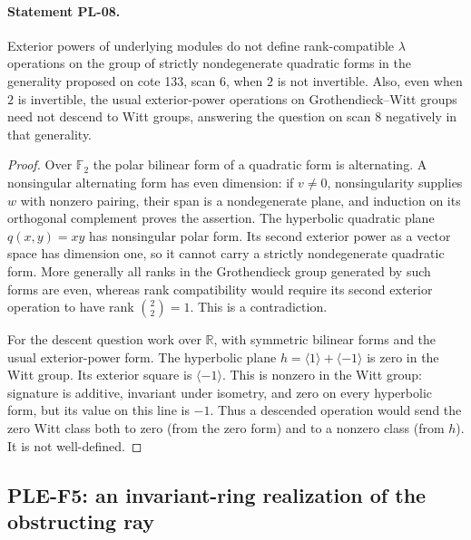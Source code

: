 \paragraph{Statement PL-08.}
Exterior powers of underlying modules do not define rank-compatible
$\lambda$ operations on the group of strictly nondegenerate quadratic forms
in the generality proposed on cote 133, scan 6, when $2$ is not invertible.
Also, even when $2$ is invertible, the usual exterior-power operations on
Grothendieck--Witt groups need not descend to Witt groups, answering the
question on scan 8 negatively in that generality.

\begin{proof}
Over $\mathbb F_2$ the polar bilinear form of a quadratic form is alternating.
A nonsingular alternating form has even dimension: if $v\ne0$,
nonsingularity supplies $w$ with nonzero pairing, their span is a
nondegenerate plane, and induction on its orthogonal complement proves
the assertion. The hyperbolic quadratic plane $q(x,y)=xy$ has nonsingular
polar form. Its second exterior power as a vector space has dimension one,
so it cannot carry a strictly nondegenerate quadratic form. More generally
all ranks in the Grothendieck group generated by such forms are even,
whereas rank compatibility would require its second exterior operation
to have rank $\binom22=1$. This is a contradiction.

For the descent question work over $\mathbb R$, with symmetric bilinear
forms and the usual exterior-power form. The hyperbolic plane
$h=\langle1\rangle+\langle-1\rangle$ is zero in the Witt group.
Its exterior square is $\langle-1\rangle$. This is nonzero in the Witt
group: signature is additive, invariant under isometry, and zero on every
hyperbolic form, but its value on this line is $-1$. Thus a descended
operation would send the zero Witt class both to zero (from the zero
form) and to a nonzero class (from $h$). It is not well-defined.
\end{proof}

\subsection{PLE-F5: an invariant-ring realization of the obstructing ray}
